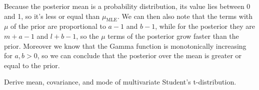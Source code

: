 \documentclass{amsmlaj}
\begin{document}
\begin{problem}
\begin{enumerate}
	Because the posterior mean is a probability distribution, its value lies
	between 0 and 1, so it's less or equal than $\mu_\text{MLE}$. We can then also
	note that the terms with $\mu$ of the prior are proportional to $a-1$ and
	$b-1$, while for the posterior they are $m+a-1$ and $l+b-1$, so the $\mu$
	terms of the posterior grow faster than the prior. Moreover we know that the
	Gamma function is monotonically increasing for $a,b>0$, so we can conclude
	that the posterior over the mean is greater or equal to the prior.

\end{enumerate}
\end{problem}

\begin{extraproblem}
Derive mean, covariance, and mode of multivariate Student's
t-distribution.
\end{extraproblem}
\end{document}
